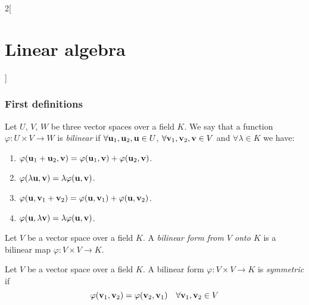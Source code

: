 \documentclass[../../../main.tex]{subfiles}
\begin{document}
\begin{multicols}{2}[\section{Linear algebra}]
  \subsubsection{First definitions}
  \begin{definition}
    Let $U$, $V$, $W$ be three vector spaces over a field $K$. We say that a function $\varphi:U\times V\rightarrow W$ is \textit{bilinear} if $\forall\boldsymbol{\mathrm{u}}_1,\boldsymbol{\mathrm{u}}_2,\boldsymbol{\mathrm{u}}\in U$, $\forall \boldsymbol{\mathrm{v}}_1,\boldsymbol{\mathrm{v}}_2,\boldsymbol{\mathrm{v}}\in V$ and $\forall\lambda\in K$ we have:
    \begin{enumerate}
      \item $\varphi(\boldsymbol{\mathrm{u}}_1+\boldsymbol{\mathrm{u}}_2,\boldsymbol{\mathrm{v}})=\varphi(\boldsymbol{\mathrm{u}}_1,\boldsymbol{\mathrm{v}})+\varphi(\boldsymbol{\mathrm{u}}_2,\boldsymbol{\mathrm{v}})$.
      \item $\varphi(\lambda \boldsymbol{\mathrm{u}},\boldsymbol{\mathrm{v}})=\lambda \varphi(\boldsymbol{\mathrm{u}},\boldsymbol{\mathrm{v}})$.
      \item $\varphi(\boldsymbol{\mathrm{u}},\boldsymbol{\mathrm{v}}_1+\boldsymbol{\mathrm{v}}_2)=\varphi(\boldsymbol{\mathrm{u}},\boldsymbol{\mathrm{v}}_1)+\varphi(\boldsymbol{\mathrm{u}},\boldsymbol{\mathrm{v}}_2)$.
      \item $\varphi(\boldsymbol{\mathrm{u}},\lambda \boldsymbol{\mathrm{v}})=\lambda \varphi(\boldsymbol{\mathrm{u}},\boldsymbol{\mathrm{v}})$.
    \end{enumerate}
  \end{definition}
  \begin{definition}
    Let $V$ be a vector space over a field $K$. A \textit{bilinear form from $V$ onto $K$} is a bilinear map $\varphi:V\times V\rightarrow K$.
  \end{definition}
  \begin{definition}
    Let $V$ be a vector space over a field $K$. A bilinear form $\varphi:V\times V\rightarrow K$ is \textit{symmetric} if $$\varphi(\boldsymbol{\mathrm{v}}_1,\boldsymbol{\mathrm{v}}_2)=\varphi(\boldsymbol{\mathrm{v}}_2,\boldsymbol{\mathrm{v}}_1)\quad\forall \boldsymbol{\mathrm{v}}_1,\boldsymbol{\mathrm{v}}_2\in V$$
  \end{definition}

\end{multicols}
\end{document}
